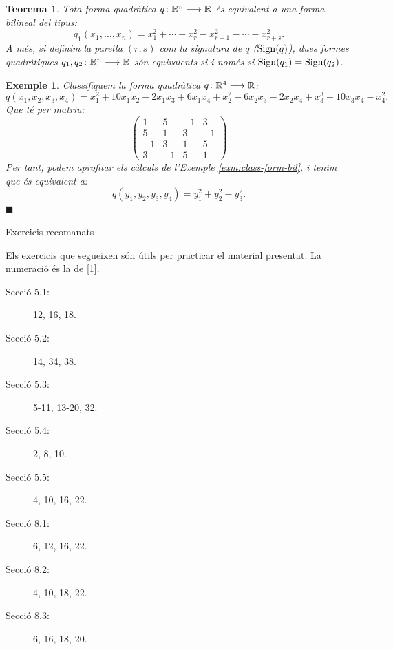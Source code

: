 \documentclass[
  11pt,
]{book}
\makeatletter
\numberwithin{dummy}{section}
\theoremstyle{maincolornumbox}
\newtheorem{theorem}{TTTT}[chapter]
\newtheorem{theoremeT}{Teorema}[chapter]
\theoremstyle{blacknumex}
\newtheorem{exampleT}{Exemple}[chapter]
\theoremstyle{blacknumbox}
\theoremstyle{maincolornum}
\renewenvironment{theorem}{\begin{tBox}\begin{theoremeT}}{\end{theoremeT}\end{tBox}}
\newenvironment{example}{\begin{exampleT}}{\hfill{\tiny\ensuremath{\blacksquare}}\end{exampleT}}
\renewcommand{\section}{\@startsection{section}{1}{\z@}
{-4ex \@plus -1ex \@minus -.4ex}
{1ex \@plus.2ex }
{\normalfont\large\sffamily\bfseries}}
\makeatother
\begin{document}
\begin{theorem}
\protect\hypertarget{thm:class-formQuadR}{}\label{thm:class-formQuadR}Tota forma
quadràtica \(q\colon \mathbb{R}^n\longrightarrow \mathbb{R}\) és equivalent a una forma bilineal del
tipus:
\[q_1(x_1,\dots, x_n)=x_1^2+ \cdots + x_r^2 - x_{r+1}^2-\cdots -x_{r+s}^2 .\]
A més, si definim la parella \((r,s)\) com la \emph{signatura de \(q\)}
(\(\operatorname{Sign}(q)\)), dues formes quadràtiques \(q_1,q_2\colon \mathbb{R}^n\longrightarrow \mathbb{R}\) són
equivalents si i només si \(\operatorname{Sign}(q_1)=\operatorname{Sign}(q_2)\).
\end{theorem}

\begin{example}
Classifiquem la forma quadràtica \(q\colon \mathbb{R}^4 \longrightarrow \mathbb{R}\):
\[q(x_1,x_2,x_3,x_4)=x_1^2+10 x_1x_2 -2 x_1x_3+6x_1x_4 + x_2^2 -6x_2x_3-2x_2x_4+x_3^3+10x_3x_4-x_4^2.\]
Que té per matriu: \[\left(\begin{array}{rrrr}
1 & 5 & -1 & 3 \\
5 & 1 & 3 & -1 \\
-1 & 3 & 1 & 5 \\
3 & -1 & 5 & 1
\end{array}\right)\] Per tant, podem aprofitar els càlculs de l'Exemple
\ref{exm:class-form-bil}, i tenim que és equivalent a:
\[q(y_1,y_2,y_3,y_4)=y_1^2+y_2^2-y_3^2.\]
\end{example}

\hypertarget{exercicis-recomanats-3}{%
\section{Exercicis recomanats}\label{exercicis-recomanats-3}}

Els exercicis que segueixen són útils per practicar el material
presentat. La numeració és la de {[}\protect\hyperlink{ref-Bret}{1}{]}.

\begin{description}
\item[Secció 5.1:]
12, 16, 18.
\item[Secció 5.2:]
14, 34, 38.
\item[Secció 5.3:]
5-11, 13-20, 32.
\item[Secció 5.4:]
2, 8, 10.
\item[Secció 5.5:]
4, 10, 16, 22.
\item[Secció 8.1:]
6, 12, 16, 22.
\item[Secció 8.2:]
4, 10, 18, 22.
\item[Secció 8.3:]
6, 16, 18, 20.
\end{description}
\end{document}
